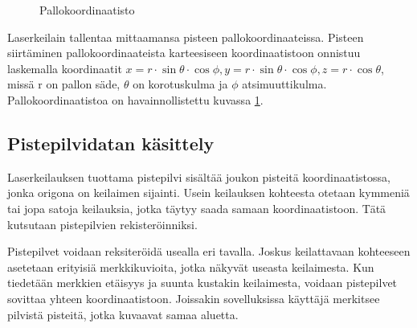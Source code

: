\begin{figure}
    \centering
    
    \caption{Pallokoordinaatisto}
    \label{pallo}
\end{figure}{}

Laserkeilain tallentaa mittaamansa pisteen pallokoordinaateissa. Pisteen siirtäminen pallokoordinaateista karteesiseen koordinaatistoon onnistuu laskemalla koordinaatit $x=r \cdot \sin \theta \cdot \cos \phi, y=r \cdot \sin \theta \cdot \cos \phi, z=r \cdot \cos \theta$, missä r on pallon säde, $\theta$ on korotuskulma ja $\phi$ atsimuuttikulma. Pallokoordinaatistoa on havainnollistettu kuvassa \ref{pallo}.



\subsection{Pistepilvidatan käsittely}\label{workflow}

Laserkeilauksen tuottama pistepilvi sisältää joukon pisteitä koordinaatistossa, jonka origona on keilaimen sijainti. Usein keilauksen kohteesta otetaan kymmeniä tai jopa satoja keilauksia, jotka täytyy saada samaan koordinaatistoon. Tätä kutsutaan pistepilvien rekisteröinniksi. 

Pistepilvet voidaan reksiteröidä usealla eri tavalla. Joskus keilattavaan kohteeseen asetetaan erityisiä merkkikuvioita, jotka näkyvät useasta keilaimesta. Kun tiedetään merkkien etäisyys ja suunta kustakin keilaimesta, voidaan pistepilvet sovittaa yhteen koordinaatistoon. Joissakin sovelluksissa käyttäjä merkitsee pilvistä pisteitä, jotka kuvaavat samaa aluetta.

